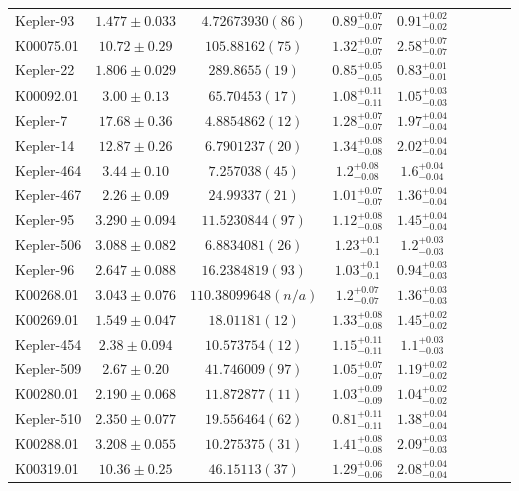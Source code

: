 \documentclass[a4paper,fleqn,usenatbib]{mnras}
\begin{document}
\begin{table*}
\begin{tabular}{lcccccccc}
Kepler-93&	$1.477 \pm 0.033$	&$ 4.72673930 (86)$    	&$0.89^{+0.07}_{-0.07}$	&$0.91^{+0.02}_{-0.02}$	\\
K00075.01&	$10.72 \pm 0.29$   &$105.88162 (75)$     	&$1.32^{+0.07}_{-0.07}$	&$2.58^{+0.07}_{-0.07}$	\\
Kepler-22&	$1.806 \pm 0.029$  &$289.8655 (19)$      	&$0.85^{+0.05}_{-0.05}$	&$0.83^{+0.01}_{-0.01}$	\\
K00092.01&	$3.00 \pm 0.13$	    &$65.70453 (17)$      	&$1.08^{+0.11}_{-0.11}$	&$1.05^{+0.03}_{-0.03}$	\\
Kepler-7&	$17.68 \pm 0.36$	&$ 4.8854862 (12)$   	&$1.28^{+0.07}_{-0.07}$	&$1.97^{+0.04}_{-0.04}$	\\
Kepler-14&	$12.87 \pm 0.26$	&$ 6.7901237 (20)$  	&$1.34^{+0.08}_{-0.08}$	&$2.02^{+0.04}_{-0.04}$	\\
Kepler-464&	$3.44 \pm 0.10$ 	&$ 7.257038 (45)$      	&$1.2^{+0.08}_{-0.08}$	&$1.6^{+0.04}_{-0.04}$	\\
Kepler-467&	$2.26 \pm 0.09$ 	&$24.99337 (21)$       	&$1.01^{+0.07}_{-0.07}$	&$1.36^{+0.04}_{-0.04}$	\\
Kepler-95&	$3.290 \pm 0.094$	&$11.5230844 (97)$     	&$1.12^{+0.08}_{-0.08}$	&$1.45^{+0.04}_{-0.04}$	\\
Kepler-506&	$3.088 \pm 0.082$	&$ 6.8834081 (26)$    	&$1.23^{+0.1}_{-0.1}$	&$1.2^{+0.03}_{-0.03}$	\\
Kepler-96&	$2.647 \pm 0.088$	&$16.2384819 (93)$     	&$1.03^{+0.1}_{-0.1}$	&$0.94^{+0.03}_{-0.03}$	\\
K00268.01&	$3.043 \pm 0.076$  &$110.38099648 (n/a)$	&$1.2^{+0.07}_{-0.07}$	&$1.36^{+0.03}_{-0.03}$	\\
K00269.01&	$1.549 \pm 0.047$	&$18.01181 (12)$       	&$1.33^{+0.08}_{-0.08}$	&$1.45^{+0.02}_{-0.02}$	\\
Kepler-454&	$2.38 \pm 0.094$	&$10.573754 (12)$   	&$1.15^{+0.11}_{-0.11}$	&$1.1^{+0.03}_{-0.03}$	\\
Kepler-509&	$2.67 \pm 0.20$ 	&$41.746009 (97) $     	&$1.05^{+0.07}_{-0.07}$	&$1.19^{+0.02}_{-0.02}$	\\
K00280.01&	$2.190 \pm 0.068$	&$11.872877 (11)$      	&$1.03^{+0.09}_{-0.09}$	&$1.04^{+0.02}_{-0.02}$	\\
Kepler-510&	$2.350 \pm 0.077$	&$19.556464 (62)$     	&$0.81^{+0.11}_{-0.11}$	&$1.38^{+0.04}_{-0.04}$	\\
K00288.01&	$3.208 \pm 0.055$	&$10.275375 (31)$      	&$1.41^{+0.08}_{-0.08}$	&$2.09^{+0.03}_{-0.03}$	\\
K00319.01&	$10.36 \pm 0.25$	&$46.15113 (37)$    	&$1.29^{+0.06}_{-0.06}$	&$2.08^{+0.04}_{-0.04}$	\\

\end{tabular}
\end{table*}
\end{document}
